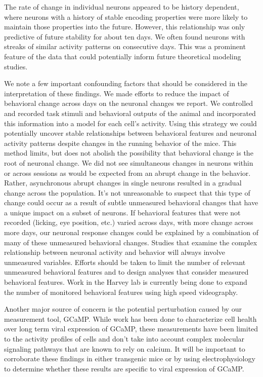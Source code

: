 The rate of change in individual neurons appeared to be history dependent, where neurons with a history of stable encoding properties were more likely to maintain those properties into the future. However, this relationship was only predictive of future stability for about ten days. We often found neurons with streaks of similar activity patterns on consecutive days. This was a prominent feature of the data that could potentially inform future theoretical modeling studies.

\bigskip

We note a few important confounding factors that should be considered in the interpretation of these findings. We made efforts to reduce the impact of behavioral change across days on the neuronal changes we report. We controlled and recorded task stimuli and behavioral outputs of the animal and incorporated this information into a model for each cell's activity. Using this strategy we could potentially uncover stable relationships between behavioral features and neuronal activity patterns despite changes in the running behavior of the mice. This method limits, but does not abolish the possibility that behavioral change is the root of neuronal change. We did not see simultaneous changes in neurons within or across sessions as would be expected from an abrupt change in the behavior. Rather, asynchronous abrupt changes in single neurons resulted in a gradual change across the population. It's not unreasonable to suspect that this type of change could occur as a result of subtle unmeasured behavioral changes that have a unique impact on a subset of neurons. If behavioral features that were not recorded (licking, eye position, etc.) varied across days, with more change across more days, our neuronal response changes could be explained by a combination of many of these unmeasured behavioral changes. Studies that examine the complex relationship between neuronal activity and behavior will always involve unmeasured variables. Efforts should be taken to limit the number of relevant unmeasured behavioral features and to design analyses that consider measured behavioral features. Work in the Harvey lab is currently being done to expand the number of monitored behavioral features using high speed videography.

\bigskip

Another major source of concern is the potential perturbation caused by our measurement tool, GCaMP. While work has been done to characterize cell health over long term viral expression of GCaMP, these measurements have been limited to the activity profiles of cells and don't take into account complex molecular signaling pathways that are known to rely on calcium. It will be important to corroborate these findings in either transgenic mice or by using electrophysiology to determine whether these results are specific to viral expression of GCaMP.

